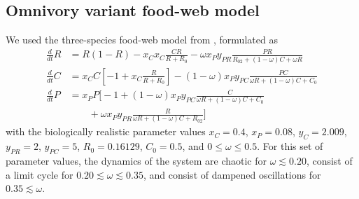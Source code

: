 \subsection{Omnivory variant food-web model}
We used the three-species food-web model from \citep{McCann1997}, formulated as
\begin{equation}
    \begin{aligned}
        \tfrac{d}{dt} R &= R ( 1 - R ) - x_C x_C \frac{CR}{R + R_0} - \omega x_P y_{PR} \frac{PR}{R_{02} + (1-\omega)C + \omega R}\\
        \tfrac{d}{dt} C &= x_C C \left[ -1 + x_C \frac{R}{R + R_0} \right] - (1 - \omega) x_P y_{PC} \frac{PC}{\omega R +(1-\omega)C + C_0}\\
        \tfrac{d}{dt} P &= x_P P \Big[ -1 + (1 - \omega)x_P y_{PC} \frac{C}{\omega R + (1-\omega)C+C_0} \\
        &\qquad + \omega x_P y_{PR}\frac{R}{\omega R + (1-\omega)C + R_{02}} \Big]
    \end{aligned}
\end{equation}
with the biologically realistic parameter values $x_C = 0.4$, $ x_P = 0.08 $, $y_C = 2.009$, $y_{PR} = 2$, $y_{PC} = 5$, $R_0 = 0.16129$, $C_0 = 0.5$, and $0 \leq \omega \leq 0.5$.
% 
For this set of parameter values, the dynamics of the system are chaotic for $\omega \lesssim 0.20$, consist of a limit cycle for $0.20 \lesssim \omega \lesssim 0.35$, and consist of dampened oscillations for $ 0.35 \lesssim \omega$.


